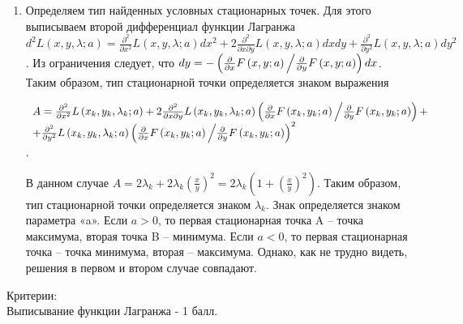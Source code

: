 \documentclass[addpoints, answers]{exam} %
\begin{document}
\begin{questions}
\begin{solution}
\begin{enumerate}
\item  Определяем тип найденных условных стационарных точек. Для этого выписываем второй дифференциал функции Лагранжа $d^{2} L\left(x,y,\lambda ;a\right)=\frac{\partial ^{2} }{\partial x^{2} } L\left(x,y,\lambda ;a\right)dx^{2} +2\frac{\partial ^{2} }{\partial x\partial y} L\left(x,y,\lambda ;a\right)dxdy+\frac{\partial ^{2} }{\partial y^{2} } L\left(x,y,\lambda ;a\right)dy^{2} $. Из ограничения следует, что $dy=-\left({\frac{\partial }{\partial x} F\left(x,y;a\right) \mathord{\left/{\vphantom{\frac{\partial }{\partial x} F\left(x,y;a\right) \frac{\partial }{\partial y} F\left(x,y;a\right)}}\right.\kern-\nulldelimiterspace} \frac{\partial }{\partial y} F\left(x,y;a\right)} \right)dx$. Таким образом, тип стационарной точки определяется знаком выражения

$\begin{array}{l} {A=\frac{\partial ^{2} }{\partial x^{2} } L\left(x_{k} ,y_{k} ,\lambda _{k} ;a\right)+2\frac{\partial ^{2} }{\partial x\partial y} L\left(x_{k} ,y_{k} ,\lambda _{k} ;a\right)\left({\frac{\partial }{\partial x} F\left(x_{k} ,y_{k} ;a\right) \mathord{\left/{\vphantom{\frac{\partial }{\partial x} F\left(x_{k} ,y_{k} ;a\right) \frac{\partial }{\partial y} F\left(x_{k} ,y_{k} ;a\right)}}\right.\kern-\nulldelimiterspace} \frac{\partial }{\partial y} F\left(x_{k} ,y_{k} ;a\right)} \right)+} \\ {+\frac{\partial ^{2} }{\partial y^{2} } L\left(x_{k} ,y_{k} ,\lambda _{k} ;a\right)\left({\frac{\partial }{\partial x} F\left(x_{k} ,y_{k} ;a\right) \mathord{\left/{\vphantom{\frac{\partial }{\partial x} F\left(x_{k} ,y_{k} ;a\right) \frac{\partial }{\partial y} F\left(x_{k} ,y_{k} ;a\right)}}\right.\kern-\nulldelimiterspace} \frac{\partial }{\partial y} F\left(x_{k} ,y_{k} ;a\right)} \right)^{2} } \end{array}$.


В данном случае $A=2\lambda _{k} +2\lambda _{k} \left(\frac{x}{y} \right)^{2} =2\lambda _{k} \left(1+\left(\frac{x}{y} \right)^{2} \right)$. Таким образом, тип стационарной точки определяется знаком $\lambda _{k} $. Знак определяется знаком параметра «a». Если $a>0$, то первая стационарная точка A -- точка максимума, вторая точка B -- минимума. Если $a<0$, то первая стационарная точка -- точка минимума, вторая -- максимума. Однако, как не трудно видеть, решения в первом и втором случае совпадают.

\end{enumerate}
Критерии:\\
Выписывание функции Лагранжа - 1 балл.


\end{solution}
\end{questions}
\end{document}
